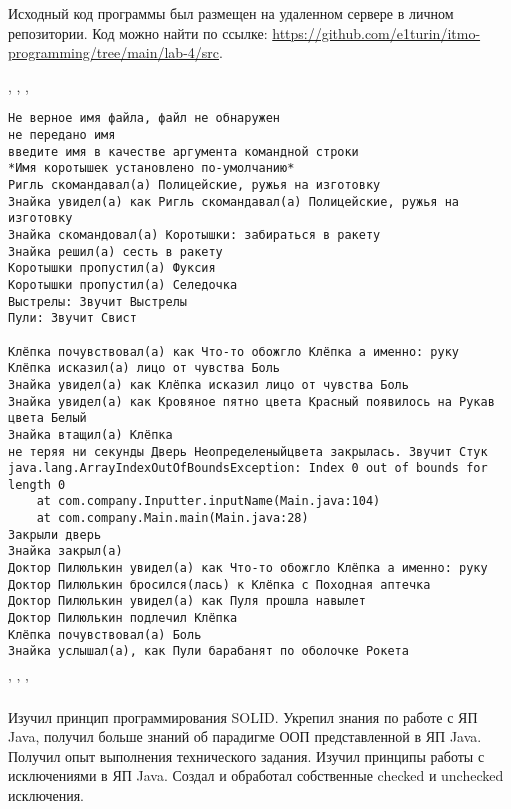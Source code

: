 

Исходный код программы был размещен на удаленном сервере в личном репозитории. Код можно найти по ссылке: \url{https://github.com/e1turin/itmo-programming/tree/main/lab-4/src}.


\begin{center}
, , ,
\end{center}
\begin{verbatim}
Не верное имя файла, файл не обнаружен
не передано имя
введите имя в качестве аргумента командной строки
*Имя коротышек установлено по-умолчанию*
Ригль скомандавал(а) Полицейские, ружья на изготовку
Знайка увидел(а) как Ригль скомандавал(а) Полицейские, ружья на изготовку
Знайка скомандовал(а) Коротышки: забираться в ракету
Знайка решил(а) сесть в ракету
Коротышки пропустил(а) Фуксия
Коротышки пропустил(а) Селедочка
Выстрелы: Звучит Выстрелы
Пули: Звучит Свист

Клёпка почувствовал(а) как Что-то обожгло Клёпка а именно: руку
Клёпка исказил(а) лицо от чувства Боль
Знайка увидел(а) как Клёпка исказил лицо от чувства Боль
Знайка увидел(а) как Кровяное пятно цвета Красный появилось на Рукав цвета Белый
Знайка втащил(а) Клёпка
не теряя ни секунды Дверь Неопределеныйцвета закрылась. Звучит Стук
java.lang.ArrayIndexOutOfBoundsException: Index 0 out of bounds for length 0
	at com.company.Inputter.inputName(Main.java:104)
	at com.company.Main.main(Main.java:28)
Закрыли дверь
Знайка закрыл(a)
Доктор Пилюлькин увидел(а) как Что-то обожгло Клёпка а именно: руку
Доктор Пилюлькин бросился(лась) к Клёпка с Походная аптечка
Доктор Пилюлькин увидел(а) как Пуля прошла навылет
Доктор Пилюлькин подлечил Клёпка
Клёпка почувствовал(а) Боль
Знайка услышал(а), как Пули барабанят по оболочке Рокета
\end{verbatim}
\begin{center}
' ' '
\end{center}

Изучил принцип программирования SOLID. Укрепил знания по работе с ЯП Java, получил больше знаний об парадигме ООП представленной в ЯП Java. Получил опыт выполнения технического задания. Изучил принципы работы с исключениями в ЯП Java. Создал и обработал собственные checked и unchecked исключения.\\
\newpage





